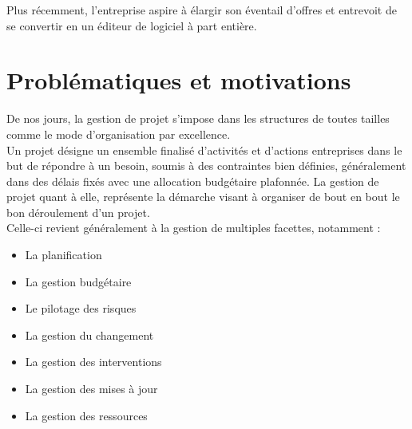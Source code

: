 \begin{spacing}{1.5}
Plus récemment, l'entreprise aspire à élargir son éventail d'offres et entrevoit de se convertir en un éditeur de logiciel à part entière.


\section{Problématiques et motivations}
De nos jours, la gestion de projet s'impose dans les structures de toutes tailles comme le mode d'organisation par excellence.\\
Un projet désigne un ensemble finalisé d'activités et d'actions entreprises dans le but de répondre à un besoin, soumis à des contraintes bien définies, généralement dans des délais fixés avec une allocation budgétaire plafonnée. La gestion de projet quant à elle, représente la démarche visant à organiser de bout en bout le bon déroulement d'un projet.\\
Celle-ci revient généralement à la gestion de multiples facettes, notamment :
\begin{itemize}
\item La planification
    \item La gestion budgétaire
    \item Le pilotage des risques
    \item La gestion du changement
    \item La gestion des interventions
    \item La gestion des mises à jour
    \item La gestion des ressources
\end{itemize}
\


\end{spacing}
